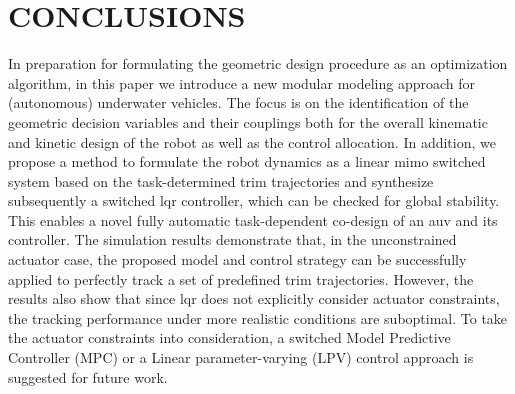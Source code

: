 
\newpage
\section{CONCLUSIONS}
In preparation for formulating the geometric design procedure as an optimization algorithm, in this paper we introduce a new modular modeling approach for (autonomous) underwater vehicles. The focus is on the identification of the geometric decision variables and their couplings both for the overall kinematic and kinetic design of the robot as well as the control allocation. In addition, we propose a method to formulate the robot dynamics as a linear \ac{mimo} switched system based on the task-determined trim trajectories and synthesize subsequently a switched \ac{lqr} controller, which can be checked for global stability. This enables a novel fully automatic task-dependent co-design of an \ac{auv} and its controller. The simulation results demonstrate that, in the unconstrained actuator case, the proposed model and control strategy can be successfully applied to perfectly track a set of predefined trim trajectories. However, the results also show that since \ac{lqr} does not explicitly consider actuator constraints, the tracking performance under more realistic conditions are suboptimal. To take the actuator constraints into consideration, a switched Model Predictive Controller (MPC) or a Linear parameter-varying (LPV) control approach is suggested for future work. 